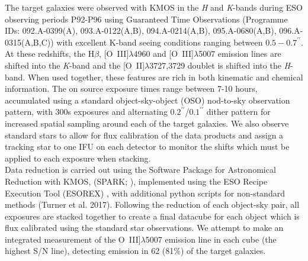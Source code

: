 \documentclass[a4paper,fleqn,usenatbib]{mn2e}
\begin{document}
The target galaxies were observed with KMOS in the {\it H} and {\it K}-bands during ESO observing periods P92-P96 using Guaranteed Time Observations (Programme IDs: 092.A-0399(A), 093.A-0122(A,B), 094.A-0214(A,B), 095.A-0680(A,B), 096.A-0315(A,B,C)) with excellent K-band seeing conditions ranging between $0.5-0.7^{\prime\prime}$.
At these redshifts, the H$\beta$, [O~{\sc III}]$\lambda$4960 and [O~{\sc III}]$\lambda$5007 emission lines are shifted into the {\it K}-band and the [O~{\sc II}]$\lambda$3727,3729 doublet is shifted into the {\it H}-band.
When used together, these features are rich in both kinematic and chemical information.
The on source exposure times range between 7-10 hours, accumulated using a standard object-sky-object (OSO) nod-to-sky observation pattern, with 300s exposures and alternating $0.2^{\prime\prime}$/$0.1^{\prime\prime}$ dither pattern for increased spatial sampling around each of the target galaxies.
We also observe standard stars to allow for flux calibration of the data products and assign a tracking star to one IFU on each detector to monitor the shifts which must be applied to each exposure when stacking. \\ 

Data reduction is carried out using the Software Package for Astronomical Reduction with KMOS, (SPARK; \cite{Davies2013}), implemented using the ESO Recipe Execution Tool (ESOREX) \citep{Freudling2013}, with additional python scripts for non-standard methods (Turner et al. 2017).
Following the reduction of each object-sky pair, all exposures are stacked together to create a final datacube for each object which is flux calibrated using the standard star observations. 
We attempt to make an integrated measurement of the O~{\sc III}]$\lambda$5007 emission line in each cube (the highest S/N line), detecting emission in 62 (81$\%$) of the target galaxies.
\end{document}
